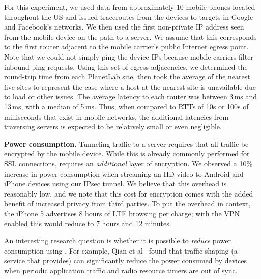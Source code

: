 For this experiment, 
we used data from approximately 10 mobile phones located throughout
the US and issued traceroutes from the devices to targets in Google
and Facebook's networks. We then used the first non-private IP address seen 
from the mobile device on the path to a server. We assume that this corresponds 
to the first router adjacent to the mobile carrier's public Internet egress point. Note that we could not simply ping the device IPs because mobile carriers filter inbound ping requests. Using this set of egress adjacencies, we determined the round-trip time from each PlanetLab site, then took the average of the nearest five sites to represent the case where a host at the nearest site is unavailable due to load or other issues. The average latency to each router was between 3\,ms and 13\,ms, with a median of 5\,ms. Thus, when compared to RTTs of 10s or 100s of milliseconds that exist in mobile networks, the additional latencies from traversing \meddle servers is expected to be relatively small or even negligible.




\noindent\textbf{Power consumption.} Tunneling traffic to a \meddle
server requires that all traffic be encrypted by the mobile
device. While this is already commonly performed for SSL connections,
\meddle requires an \emph{additional} layer of encryption. We observed
a 10\% increase in power consumption when streaming an HD video to
Android and iPhone devices using our IPsec tunnel. We believe that this 
overhead is reasonably low, and we note that this cost for encryption comes with the added benefit of increased 
privacy from third parties. To put the overhead in context, the iPhone 5 advertises 
8 hours of LTE browsing per charge; with the VPN enabled this would reduce to 
7 hours and 12 minutes.

An interesting research question is whether it is possible to \emph{reduce} power consumption using \meddle. For example, Qian et al~\cite{qian:rrc,qian:aro,qian:periodic} found that traffic shaping (a service that \meddle provides) can significantly reduce the power consumed by devices when periodic application traffic and radio resource timers are out of sync.

